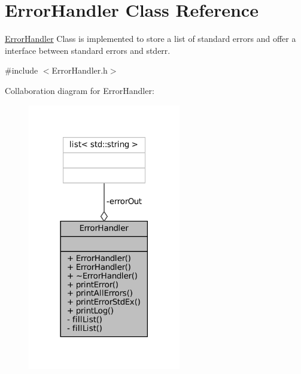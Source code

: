 \hypertarget{classErrorHandler}{}\section{Error\+Handler Class Reference}
\label{classErrorHandler}


\mbox{\hyperlink{classErrorHandler}{Error\+Handler}} Class is implemented to store a list of standard errors and offer a interface between standard errors and stderr.  




{\ttfamily \#include $<$Error\+Handler.\+h$>$}



Collaboration diagram for Error\+Handler\+:
\nopagebreak
\begin{figure}[H]
\begin{center}
\leavevmode
\includegraphics[width=189pt]{classErrorHandler__coll__graph}
\end{center}
\end{figure}
